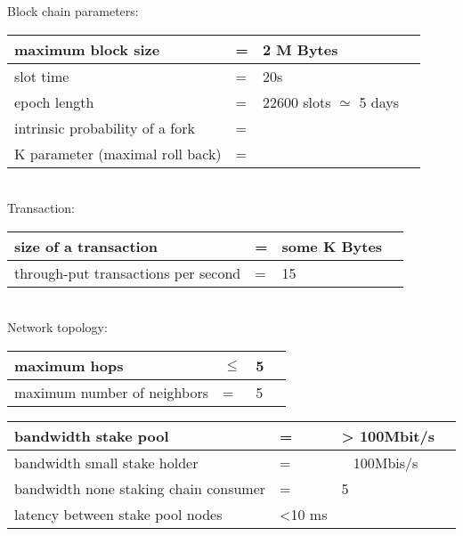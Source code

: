 \documentclass{report}
\theoremstyle{definition}{
  \newtheorem{lemma}{Lemma}[section] %
  \newtheorem{definition}[lemma]{Definition}
}
\theoremstyle{theorem}{
  \newtheorem{invariant}[lemma]{Invariant}
  \newtheorem{proofobligation}[lemma]{Proof Obligation}
}
\numberwithin{equation}{lemma}
\begin{document}
Block chain parameters:\\
\begin{tabular}{p{4cm}p{1cm}p{6cm}p{1cm}} \hline
  maximum block size   & = & 2 M Bytes                                    &  \\ \hline
  slot time            & = & 20s                                          &  \\ \hline
  epoch length         & = & 22600 slots $\simeq$ 5 days                  &  \\ \hline
  intrinsic probability of a fork & = &                                   &  \\ \hline
  K parameter (maximal roll back) & = &                                   &  \\ \hline
\end{tabular}\\

Transaction:\\
\begin{tabular}{p{4cm}p{1cm}p{6cm}p{1cm}} \hline
  size of a transaction                & = &  some K Bytes               &  \\ \hline
  through-put transactions per second   & = &  15                        &  \\ \hline
\end{tabular}\\

Network topology:\\
\begin{tabular}{p{4cm}p{1cm}p{6cm}p{1cm}} \hline
  maximum hops                         & $\le$ &  5                         &  \\ \hline
  maximum number of neighbors          & = &  5                         &  \\ \hline
\end{tabular}

\begin{tabular}{p{4cm}p{1cm}p{6cm}p{1cm}} \hline
  bandwidth stake pool                             & = &  > 100Mbit/s             &  \\ \hline
  bandwidth small stake holder                    & = &  ~ 100Mbis/s             &  \\ \hline
  bandwidth none staking chain consumer          & = &  5                       &  \\ \hline
  latency  between stake pool nodes                & <10 ms                       &  \\ \hline
\end{tabular}\\
\end{document}
